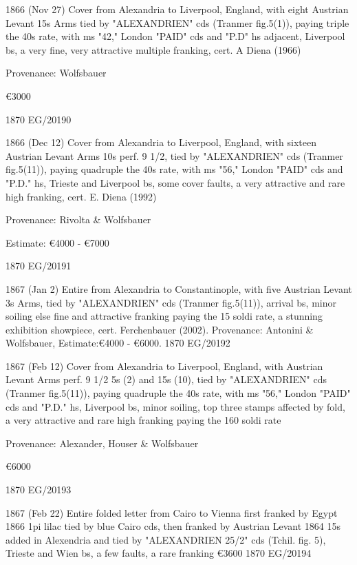 \documentclass[justified]{tufte-book}
\begin{document}
%
{1866 (Nov 27) Cover from Alexandria to Liverpool, England, with eight Austrian Levant 15s Arms tied by "ALEXANDRIEN" cds (Tranmer fig.5(1)), paying triple the 40s rate, with ms "42," London "PAID" cds and "P.D" hs adjacent, Liverpool bs, a very fine, very attractive multiple franking, cert. A Diena (1966)

Provenance: Wolfsbauer

\euro3000
 }%
{1870}%
{EG/20190}%
{}%
{}
{}%
{}

%
{1866 (Dec 12) Cover from Alexandria to Liverpool, England, with sixteen Austrian Levant Arms 10s perf. 9 1/2, tied by "ALEXANDRIEN" cds (Tranmer fig.5(11)), paying quadruple the 40s rate, with ms "56," London "PAID" cds and "P.D." hs, Trieste and Liverpool bs, some cover faults, a very attractive and rare high franking, cert. E. Diena (1992)

Provenance: Rivolta \& Wolfsbauer

Estimate: \euro 4000 - \euro 7000
 }%
{1870}%
{EG/20191}%
{}%
{}
{}%
{}


%
{1867 (Jan 2) Entire from Alexandria to Constantinople, with five Austrian Levant 3s Arms, tied by "ALEXANDRIEN" cds (Tranmer fig.5(11)), arrival bs, minor soiling else fine and attractive franking paying the 15 soldi rate, a stunning exhibition showpiece, cert. Ferchenbauer (2002). 
Provenance: Antonini \& Wolfsbauer,  
\FE Estimate:\euro 4000 - \euro 6000. 
 }%
{1870}%
{EG/20192}%
{}%
{}
{}%
{}


%
{1867 (Feb 12) Cover from Alexandria to Liverpool, England, with Austrian Levant Arms perf. 9 1/2 5s (2) and 15s (10), tied by "ALEXANDRIEN" cds (Tranmer fig.5(11)), paying quadruple the 40s rate, with ms "56," London "PAID" cds and "P.D." hs, Liverpool bs, minor soiling, top three stamps affected by fold, a very attractive and rare high franking paying the 160 soldi rate

Provenance: Alexander, Houser \& Wolfsbauer

\euro 6000}
{1870}%
{EG/20193}%
{}%
{}
{}%
{}

%
{1867 (Feb 22) Entire folded letter from Cairo to Vienna first franked by Egypt 1866 1pi lilac tied by blue Cairo cds, then franked by Austrian Levant 1864 15s added in Alexendria and tied by "ALEXANDRIEN 25/2" cds (Tchil. fig. 5), Trieste and Wien bs, a few faults, a rare franking 
\euro 3600}
{1870}%
{EG/20194}%
{}%
{}
{}%
{}
\end{document}
